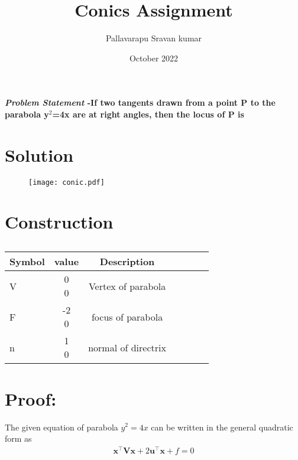 \documentclass[journal,10pt,twocolumn]{article}
\title{\textbf{Conics Assignment}}
\author{Pallavarapu Sravan kumar}
\date{October 2022}
\let\vec\mathbf
\newcommand{\myvec}[1]{\ensuremath{\begin{pmatrix}#1\end{pmatrix}}}
\begin{document}
\maketitle
\paragraph{\textit{\large Problem Statement} -If two tangents drawn from a point P to the parabola y$^2$=4x are at right angles, then the locus of P is}
\section*{\large Solution}
\begin{figure}[H]
\centering
\texttt{[image: conic.pdf]}
\caption{}
\end{figure}

\section*{\large Construction}

\begin{table}[htbp]
 \begin{center}
    \begin{tabular}{|l|c|c|c|c|c|c} \hline \textbf{Symbol}
  & \textbf{value} & \textbf{Description} \\
 \hline
V &\myvec{0\\0} & Vertex of parabola\\ \hline
F&\myvec{-2\\0} & focus of parabola\\ \hline
n &\myvec{1\\0}   & normal of directrix\\ \hline

	
\end{tabular}   
\end{center}
\caption{\label{table:dummytable} }
\end{table}



\section*{Proof:}


The given equation of parabola $y^2 = 4x$ can be written in the general quadratic form as
\begin{align}
    \label{eq:conic_quad_form}
    \vec{x}^{\top}\vec{V}\vec{x}+2\vec{u}^{\top}\vec{x}+f=0
    \end{align}
\end{document}
